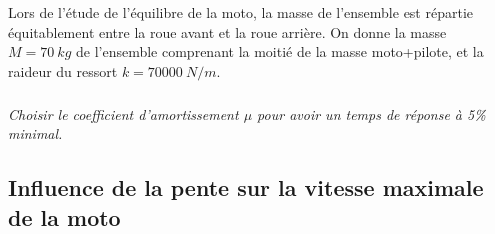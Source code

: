 \documentclass[10pt,fleqn]{article} %
\begin{document}
\begin{multicols}{2}
Lors de l’étude de l’équilibre de la moto, la masse de l’ensemble est répartie équitablement entre la roue avant et la roue arrière. On donne la masse $M=\SI{70}{kg}$ de l’ensemble comprenant la moitié de la masse moto+pilote, et
la raideur du ressort $k=\SI{70000}{N/m}$.

\subparagraph{}
\textit{Choisir le coefficient d’amortissement $\mu$ pour avoir un temps de réponse à 5\% minimal.}
\ifprof
\begin{corrige}
\end{corrige}
\else
\fi

%
%
%


\subsection*{Influence de la pente sur la vitesse maximale de la moto}



\end{multicols}
\end{document}
